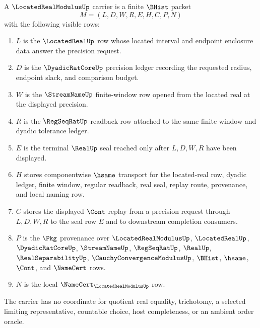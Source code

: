 \begin{definition}
\label{def:located-real-modulus-carrier}
A $\LocatedRealModulusUp$ carrier is a finite $\BHist$ packet
$$
M=(L,D,W,R,E,H,C,P,N)
$$
with the following visible rows:
\begin{enumerate}
\item $L$ is the $\LocatedRealUp$ row whose located interval and endpoint enclosure data answer the precision request.
\item $D$ is the $\DyadicRatCoreUp$ precision ledger recording the requested radius, endpoint slack, and comparison budget.
\item $W$ is the $\StreamNameUp$ finite-window row opened from the located real at the displayed precision.
\item $R$ is the $\RegSeqRatUp$ readback row attached to the same finite window and dyadic tolerance ledger.
\item $E$ is the terminal $\RealUp$ seal reached only after $L,D,W,R$ have been displayed.
\item $H$ stores componentwise $\hsame$ transport for the located-real row, dyadic ledger, finite window, regular readback, real seal, replay route, provenance, and local naming row.
\item $C$ stores the displayed $\Cont$ replay from a precision request through $L,D,W,R$ to the seal row $E$ and to downstream completion consumers.
\item $P$ is the $\Pkg$ provenance over $\LocatedRealModulusUp$, $\LocatedRealUp$, $\DyadicRatCoreUp$, $\StreamNameUp$, $\RegSeqRatUp$, $\RealUp$, $\RealSeparabilityUp$, $\CauchyConvergenceModulusUp$, $\BHist$, $\hsame$, $\Cont$, and $\NameCert$ rows.
\item $N$ is the local $\NameCert_{\LocatedRealModulusUp}$ row.
\end{enumerate}
The carrier has no coordinate for quotient real equality, trichotomy, a selected limiting representative, countable choice, host completeness, or an ambient order oracle.
\end{definition}

